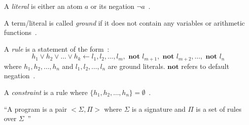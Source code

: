 
\begin{definition}
    A \textit{literal} is either an atom $a$ or its negation $\neg a$~\citep{balduccini_asp_2011}.
\end{definition}

\begin{definition}
    A term/literal is called \textit{ground} if it does not contain any variables or arithmetic functions~\citep{blount_architecture_2013}.
\end{definition}

\begin{definition}
    A \textit{rule} is a statement of the form~\citep{balduccini_asp_2011}:
    \begin{equation}
    h_1 \lor h_2 \lor \dots \lor h_k \leftarrow l_1, l_2, \dots, l_m, \textbf{ not } l_{m+1}, \textbf{ not } l_{m+2}, \dots, \textbf{ not } l_n
    \end{equation}
    where $h_1, h_2, \dots, h_n$ and $l_1, l_2, \dots, l_n$ are ground literals.
    $\textbf{not}$ refers to default negation~\citep{balduccini_asp_2011}.
\end{definition}

\begin{definition}
    A \textit{constraint} is a rule where $\{ h_1, h_2, \dots, h_n \} = \emptyset$~\citep{balduccini_asp_2011}.
\end{definition}

\begin{definition}
    ``A program is a pair $<\Sigma, \Pi>$ where $\Sigma$ is a signature and $\Pi$ is a set of rules over $\Sigma$~\citep{balduccini_asp_2011}''
\end{definition}


